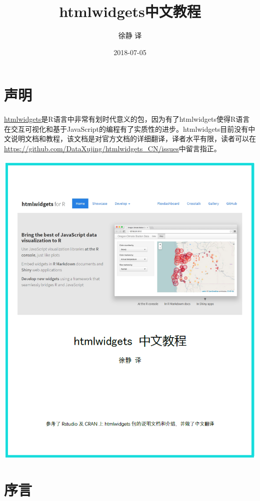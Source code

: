 \documentclass[]{book}
\title{htmlwidgets中文教程}
\author{徐静 译}
\date{2018-07-05}
\theoremstyle{definition}
\theoremstyle{definition}
\theoremstyle{definition}
\theoremstyle{remark}
\begin{document}
\maketitle

{
\setcounter{tocdepth}{1}
\tableofcontents
}
\chapter*{声明}

\href{https://CRAN.R-project.org/package=htmlwidgets}{htmlwidgets}是R语言中非常有划时代意义的包，因为有了htmlwidgets使得R语言在交互可视化和基于JavaScript的编程有了实质性的进步。htmlwidgets目前没有中文说明文档和教程，该文档是对官方文档的详细翻译，译者水平有限，读者可以在\url{https://github.com/DataXujing/htmlwidgets_CN/issues}中留言指正。

\begin{center}\includegraphics[height=0.7\textheight]{pic/cover} \end{center}

\chapter*{序言}
\end{document}
